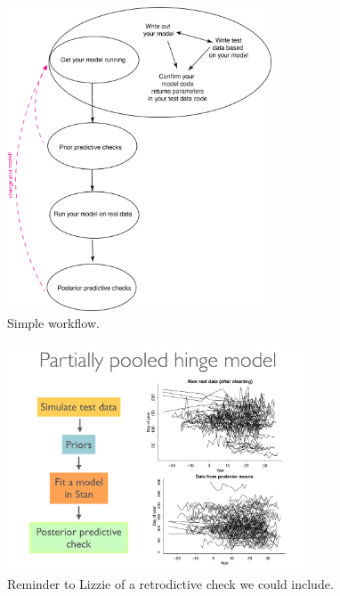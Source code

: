 \documentclass[11pt]{article}
\begin{document}
\begin{figure}[ht]
\centering
\noindent \includegraphics[width=0.7\textwidth]{figures/workflow.png}
\caption{Simple workflow.}
\label{fig:workflow}
\end{figure}

\begin{figure}[ht]
\centering
\noindent \includegraphics[width=0.8\textwidth]{figures/Pages_from_generablestannyc.pdf}
\caption{Reminder to Lizzie of a retrodictive check we could include.}
\label{fig:retrodictivecheck}
\end{figure}
\end{document}
